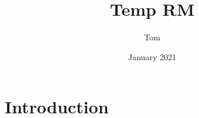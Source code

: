 \documentclass{article}
\title{Temp RM}
\author{Tom}
\date{January 2021}
\begin{document}
\maketitle

\section{Introduction}
\end{document}
